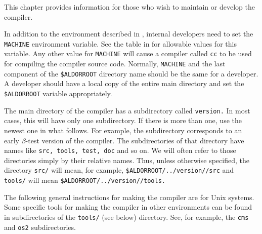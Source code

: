 %

This chapter provides information for those who wish to maintain
or develop the \asharp{} compiler.


In addition to the environment described in ,
internal developers need to set the {\tt MACHINE} environment variable.
See the table in  for allowable values for this
variable.
Any other value for {\tt MACHINE} will cause a compiler called
{\tt cc} to be used for compiling the compiler source code.
Normally, {\tt MACHINE} and the last component of the
{\tt \$ALDORROOT} directory name should be the same for a developer.
A developer should have a local copy of the entire main directory and
set the {\tt \$ALDORROOT} variable appropriately.

The main directory of the compiler has a subdirectory called
{\tt version.}
In most cases, this will have only one subdirectory.
If there is more than one, use the newest one in what follows.
For example, the subdirectory {\tt \asharpver{}} corresponds to an
early $\beta$-test version of the compiler.
The subdirectories of that directory have names like {\tt src,
tools, test, doc} and so on.
We will often refer to those directories simply by their
relative names.
Thus, unless otherwise specified, the directory {\tt src/} will
mean, for example, {\tt \$ALDORROOT/../version/\asharpver{}/src} and {\tt
tools/} will mean {\tt \$ALDORROOT/../version/\asharpver{}/tools.}


The following general instructions for making the compiler are
for Unix systems.
Some specific tools for making the compiler in other environments
can be found in subdirectories of the {\tt tools/} (see below) directory.
See, for example, the {\tt cms} and {\tt os2} subdirectories.

